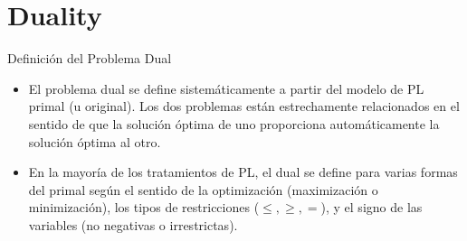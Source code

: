 
\section{Duality}
\label{sec:duality}



\begin{frame}{Definición del Problema Dual}
  \begin{itemize}\justifying \parskip3mm


\item  El problema dual se define sistemáticamente a partir del modelo de PL primal (u original). Los dos problemas están estrechamente relacionados en el sentido de que la solución óptima de uno proporciona automáticamente la solución óptima al otro.
\item   En la mayoría de los tratamientos de PL, el dual se define para varias formas del primal según el sentido de la optimización (maximización o minimización), los tipos de restricciones ($\leq,  \geq, =$), y el signo de las variables (no negativas o irrestrictas).
  \end{itemize}
\end{frame}


